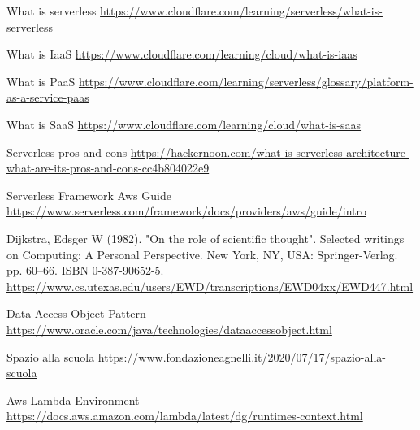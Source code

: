 \begin{thebibliography}{9}

     What is serverless
    \url{https://www.cloudflare.com/learning/serverless/what-is-serverless}

     What is IaaS
    \url{https://www.cloudflare.com/learning/cloud/what-is-iaas}

     What is PaaS
    \url{https://www.cloudflare.com/learning/serverless/glossary/platform-as-a-service-paas}

     What is SaaS
    \url{https://www.cloudflare.com/learning/cloud/what-is-saas}

     Serverless pros and cons
    \url{https://hackernoon.com/what-is-serverless-architecture-what-are-its-pros-and-cons-cc4b804022e9}

     Serverless Framework Aws Guide
    \url{https://www.serverless.com/framework/docs/providers/aws/guide/intro}

      Dijkstra, Edsger W (1982).
    "On the role of scientific thought". Selected writings on Computing: A Personal
    Perspective. New York, NY, USA: Springer-Verlag. pp. 60–66. ISBN 0-387-90652-5.
    \url{https://www.cs.utexas.edu/users/EWD/transcriptions/EWD04xx/EWD447.html}

     Data Access Object Pattern
    \url{https://www.oracle.com/java/technologies/dataaccessobject.html}

     Spazio alla scuola
    \url{https://www.fondazioneagnelli.it/2020/07/17/spazio-alla-scuola}

     Aws Lambda Environment
    \url{https://docs.aws.amazon.com/lambda/latest/dg/runtimes-context.html}

\end{thebibliography}
